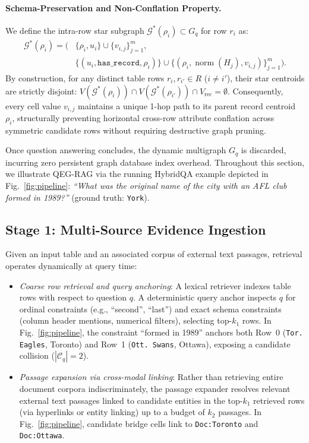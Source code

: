 \documentclass[runningheads]{llncs}
\begin{document}
\paragraph{Schema-Preservation and Non-Conflation Property.}
We define the intra-row star subgraph $\mathcal{G}^*(\rho_i) \subset G_q$ for row $r_i$ as:
\begin{equation}
\label{eq:star-subgraph}
\begin{aligned}
\mathcal{G}^*(\rho_i) = \Big( &\{\rho_i, u_i\} \cup \{v_{i,j}\}_{j=1}^m, \\
&\{(u_i, \texttt{has\_record}, \rho_i)\} \cup \{(\rho_i, \operatorname{norm}(H_j), v_{i,j})\}_{j=1}^m \Big).
\end{aligned}
\end{equation}
By construction, for any distinct table rows $r_i, r_{i'} \in R$ ($i \neq i'$), their star centroids are strictly disjoint: $V(\mathcal{G}^*(\rho_i)) \cap V(\mathcal{G}^*(\rho_{i'})) \cap V_{\text{rec}} = \emptyset$. Consequently, every cell value $v_{i,j}$ maintains a unique 1-hop path to its parent record centroid $\rho_i$, structurally preventing horizontal cross-row attribute conflation across symmetric candidate rows without requiring destructive graph pruning.

Once question answering concludes, the dynamic multigraph $G_q$ is discarded, incurring zero persistent graph database index overhead. Throughout this section, we illustrate QEG-RAG via the running HybridQA example depicted in Fig.~\ref{fig:pipeline}: \textit{``What was the original name of the city with an AFL club formed in 1989?''} (ground truth: \texttt{York}).

\subsection{Stage 1: Multi-Source Evidence Ingestion}
\label{sec:method-retrieval}
Given an input table and an associated corpus of external text passages, retrieval operates dynamically at query time:
\begin{itemize}[leftmargin=1.5em]
    \item \emph{Coarse row retrieval and query anchoring}: A lexical retriever indexes table rows with respect to question $q$. A deterministic query anchor inspects $q$ for ordinal constraints (e.g., ``second'', ``last'') and exact schema constraints (column header mentions, numerical filters), selecting top-$k_1$ rows. In Fig.~\ref{fig:pipeline}, the constraint ``formed in 1989'' anchors both Row~0 (\texttt{Tor. Eagles}, Toronto) and Row~1 (\texttt{Ott. Swans}, Ottawa), exposing a candidate collision ($|\mathcal{C}_q| = 2$).
    \item \emph{Passage expansion via cross-modal linking}: Rather than retrieving entire document corpora indiscriminately, the passage expander resolves relevant external text passages linked to candidate entities in the top-$k_1$ retrieved rows (via hyperlinks or entity linking) up to a budget of $k_2$ passages. In Fig.~\ref{fig:pipeline}, candidate bridge cells link to \texttt{Doc:Toronto} and \texttt{Doc:Ottawa}.
\end{itemize}
\end{document}
